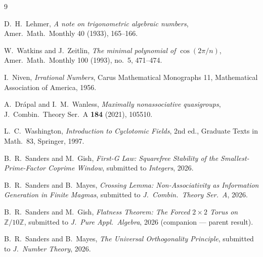 \documentclass[11pt,reqno]{amsart}
\theoremstyle{plain}
\theoremstyle{definition}
\newcommand{\Z}{\mathbb{Z}}
\begin{document}
\begin{thebibliography}{9}

D.~H.~Lehmer,
\emph{A note on trigonometric algebraic numbers},
Amer.\ Math.\ Monthly 40 (1933), 165--166.

W.~Watkins and J.~Zeitlin,
\emph{The minimal polynomial of $\cos(2 \pi / n)$},
Amer.\ Math.\ Monthly 100 (1993), no.\ 5, 471--474.

I.~Niven,
\emph{Irrational Numbers},
Carus Mathematical Monographs 11, Mathematical Association of America, 1956.

A.~Dr\'apal and I.~M.~Wanless,
\emph{Maximally nonassociative quasigroups},
J.\ Combin.\ Theory Ser.\ A \textbf{184} (2021), 105510.

L.~C.~Washington,
\emph{Introduction to Cyclotomic Fields}, 2nd ed.,
Graduate Texts in Math.\ 83, Springer, 1997.

B.~R.~Sanders and M.~Gish,
\emph{First-G Law: Squarefree Stability of the Smallest-Prime-Factor Coprime Window},
submitted to \emph{Integers}, 2026.

B.~R.~Sanders and B.~Mayes,
\emph{Crossing Lemma: Non-Associativity as Information Generation in Finite Magmas},
submitted to \emph{J.\ Combin.\ Theory Ser.\ A}, 2026.

B.~R.~Sanders and M.~Gish,
\emph{Flatness Theorem: The Forced $2 \times 2$ Torus on $\Z/10\Z$},
submitted to \emph{J.\ Pure Appl.\ Algebra}, 2026 (companion --- parent result).

B.~R.~Sanders and B.~Mayes,
\emph{The Universal Orthogonality Principle},
submitted to \emph{J.\ Number Theory}, 2026.

\end{thebibliography}
\end{document}
